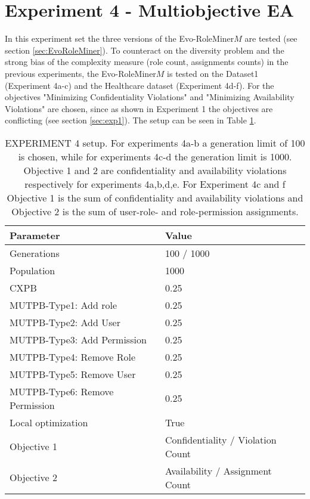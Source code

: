 \section{Experiment 4 - Multiobjective EA}
\label{sec:exp4}
In this experiment set the three versions of the Evo-RoleMiner$M$ are tested (see section \ref{sec:EvoRoleMiner}). To counteract on the diversity problem and the strong bias of the complexity measure (role count, assignments counts) in the previous experiments, the Evo-RoleMiner$M$ is tested on the Dataset1 (Experiment 4a-c) and the Healthcare dataset (Experiment 4d-f). For the objectives "Minimizing Confidentiality Violations" and "Minimizing Availability Violations" are chosen, since as shown in Experiment 1 the objectives are conflicting (see section \ref{sec:exp1}). The setup can be seen in Table \ref{tab:exp4_setup}.

\begin{table}[H]
	\centering
	\begin{adjustbox}{width=0.75\textwidth}
		\begin{tabular}{|l|l|}
			\hline
			\rowcolor{myGray} 
			\textbf{Parameter}              & \textbf{Value}    \\ \hline
			Generations                     & 100 / 1000       	\\ \hline
			Population                      & 1000        		\\ \hline
			CXPB                            & 0.25              \\ \hline
			MUTPB-Type1: Add role           & 0.25              \\ \hline
			MUTPB-Type2: Add User           & 0.25              \\ \hline
			MUTPB-Type3: Add Permission     & 0.25              \\ \hline
			MUTPB-Type4: Remove Role        & 0.25              \\ \hline
			MUTPB-Type5: Remove User        & 0.25              \\ \hline
			MUTPB-Type6: Remove Permission  & 0.25              \\ \hline
			Local optimization              & True        		\\ \hline
			Objective 1					    & Confidentiality / Violation Count   \\ \hline
			Objective 2					    & Availability / Assignment Count    	\\ \hline
		\end{tabular}
	\end{adjustbox}
	\caption{EXPERIMENT 4 setup. For experiments 4a-b a generation limit of 100 is chosen, while for experiments 4c-d the generation limit is 1000. Objective 1 and 2 are confidentiality and availability violations respectively for experiments 4a,b,d,e. For Experiment 4c and f Objective 1 is the sum of confidentiality and availability violations and Objective 2 is the sum of user-role- and role-permission assignments.}
	\label{tab:exp4_setup}
\end{table}

